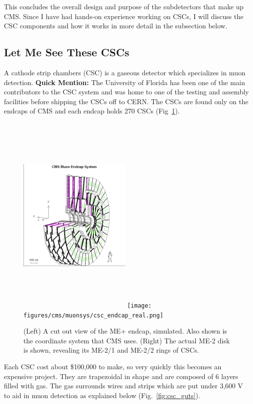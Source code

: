 This concludes the overall design and purpose of the subdetectors that make up CMS.
Since I have had hands-on experience working on CSCs, I will discuss the CSC components and how it works in more detail in the subsection below.

\subsection{Let Me See These CSCs}

A cathode strip chambers (CSC) is a gaseous detector which specializes in muon detection. 
{\bf Quick Mention:} The University of Florida has been one of the main contributors to the CSC system and was home to one of the testing and assembly facilities before shipping the CSCs off to CERN.
The CSCs are found only on the endcaps of CMS and each endcap holds 270 CSCs (Fig~\ref{fig:cms_endcap}). 
\begin{figure}[pbth]
\centering
\includegraphics[width=0.49\textwidth,height=10cm,keepaspectratio]{figures/cms/muonsys/csc_endcap_cutaway.png}
\texttt{[image: figures/cms/muonsys/csc\_endcap\_real.png]}
    \caption{
    (Left) A cut out view of the ME+ endcap, simulated. Also shown is the coordinate system that CMS uses.
    (Right) The actual ME-2 disk is shown, revealing its ME-2/1 and ME-2/2 rings of CSCs.
    }
    \label{fig:cms_endcap}
\end{figure}
Each CSC cost about \$100,000 to make, so very quickly this becomes an expensive project.
They are trapezoidal in shape and are composed of 6 layers filled with gas.
The gas surrounds wires and strips which are put under 3,600 V to aid in muon detection as explained below (Fig.~\ref{fig:csc_guts}). 
